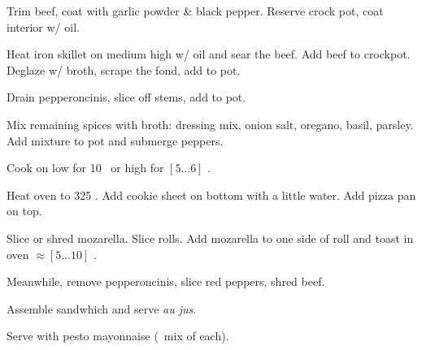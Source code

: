\begin{preparation}
\item Trim beef, coat with garlic powder \& black pepper.
	Reserve crock pot, coat interior w/ oil.

\item Heat iron skillet on medium high w/ oil and sear the beef.
	Add beef to crockpot.
	Deglaze w/ broth, scrape the fond, add to pot.

\item Drain pepperoncinis, slice off stems, add to pot.

\item Mix remaining spices with broth: dressing mix, onion salt, oregano, basil, parsley.
	Add mixture to pot and submerge peppers.

\item Cook on low for 10 \hour~or high for $[5\dots6]$ \hour.

\item Heat oven to 325 \Fahrenheit.
	Add cookie sheet on bottom with a little water.
	Add pizza pan on top.

\item Slice or shred mozarella.
	Slice rolls.
	Add mozarella to one side of roll and toast in oven $\approx[5\dots10]$ \minute.

\item Meanwhile, remove pepperoncinis, slice red peppers, shred beef.

\item Assemble sandwhich and serve \textit{au jus}.
\end{preparation}


\begin{variation}
\item Serve with pesto mayonnaise (\onehalf~mix of each).
\end{variation}


\recipeend

